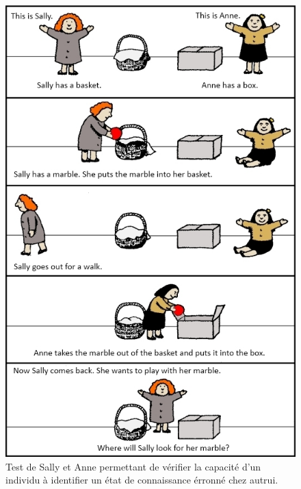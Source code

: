 \documentclass[a4paper,11pt,twoside]{StyleThese}
\begin{document}
\begin{figure}[ht!]
 \centering
  \includegraphics[width=0.89\linewidth]{./img/sally.jpg} 
  \caption {Test de Sally et Anne permettant de vérifier la capacité d'un individu à identifier un état de connaissance érronné chez autrui.}
  \label{fig:sallyAndAnne}
\end{figure}


\end{document}
